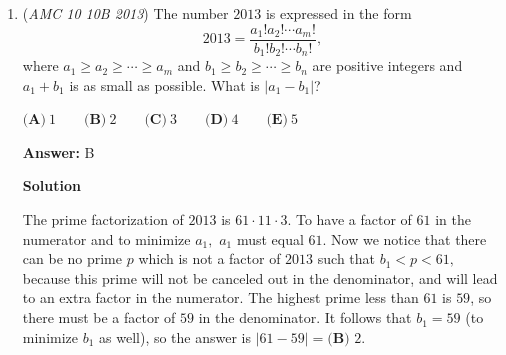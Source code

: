 \begin{enumerate}
 



\textbf{Solution 7 (guess)}

Set a arbitrary difference of $a$, $b$, and $c$ as $k$. With this knowladge, we can see that if the root is $r$, we can apply Vieta's formula (sum of roots) to see that $2r = -\frac{k + c}{2k + c}$, which because both $c$ and $k$ positive, is between $0$ and $-1$. With this, we can eliminate choices $A$, $B$, and $C$, leaving only $D$ and $E$ as possible options for the answer. From now, you can just try out the answer choices or just guess, since now you have a higher expected score then to leave it blank.
-DolphinDude314

 



\textbf{Solution 8}

Suppose $a$, $b$, and $c$ are $k+n$, $k$, $k-n$ respectively. Then the discriminant of the quadratic will be$\Delta = b^2 - 4ac = (k)^2 - 4(k+n)(k-n) = k^2 - 4(k^2 - n^2) = k^2 - 4k^2 + 4n^2 = 4n^2 - 3k^2$. Then, we get $n = \pm\frac{\sqrt{3}}{2}k$. We recall that $a \geq b \geq c \geq 0$, therefore $n = \frac{\sqrt{3}}{2}k$.Because this equals 0, the root of the quadratic is $-\frac{b}{2a} = -\frac{k}{2(k+n)}$. $-\frac{b}{2a} = -\frac{k}{2(k+n)} = -\frac{k}{2\left(k+\dfrac{\sqrt{3}}{2}k\right)} = -\frac{k}{2k\left(1+\dfrac{\sqrt{3}}{2}\right)}$$-\frac{1}{2\left(1+\dfrac{\sqrt{3}}{2}\right)} = -\frac{1}{2+\sqrt{3}} = -\frac{2-\sqrt{3}}{(2+\sqrt{3})(2-\sqrt{3})} = -\frac{2-\sqrt{3}}{4-3} = -(2-\sqrt{3}) = \sqrt{3}-2$. Therefore, the answer is $\boxed{(D)}$~beigetomcat72

 


	\item (\textit{AMC 10 10B 2013}) The number $2013$ is expressed in the form 
 \[2013=\frac{a_1!a_2!\cdots a_m!}{b_1!b_2!\cdots b_n!},\] where $a_1\ge a_2\ge\cdots\ge a_m$ and $b_1\ge b_2\ge\cdots\ge b_n$ are positive integers and $a_1+b_1$ is as small as possible. What is $|a_1-b_1|$?


 $\textbf{(A)}\ 1\qquad\textbf{(B)}\ 2\qquad\textbf{(C)}\ 3\qquad\textbf{(D)}\ 4\qquad\textbf{(E)}\ 5$

 \textbf{Answer: }B



\textbf{Solution}

The prime factorization of $2013$ is $61\cdot11\cdot3$. To have a factor of $61$ in the numerator and to minimize $a_1,$ $a_1$ must equal $61$. Now we notice that there can be no prime $p$ which is not a factor of $2013$ such that $b_1<p<61,$ because this prime will not be canceled out in the denominator, and will lead to an extra factor in the numerator. The highest prime less than $61$ is $59$, so there must be a factor of $59$ in the denominator. It follows that $b_1 = 59$ (to minimize $b_1$ as well), so the answer is $|61-59| = \boxed{\textbf{(B) }2}$.


\end{enumerate}
